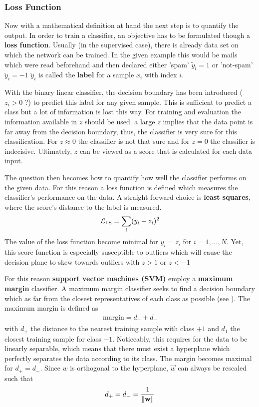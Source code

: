 \subsubsection{Loss Function}
Now with a mathematical definition at hand the next step is to quantify the output.
In order to train a classifier, an objective has to be formulated though a \textbf{loss function}.
Usually (in the supervised case), there is already data set on which the network can be trained.
In the given example this would be mails which were read beforehand and then declared either 'spam' $\tilde{y}_i = 1$ or 'not-spam' $\tilde{y}_i = -1$
$\tilde{y}_i$ is called the \textbf{label} for a sample $x_i$ with index $i$.

With the binary linear classifier, the decision boundary has been introduced ($z_i > 0$ ?) to predict this label for any given sample.
This is sufficient to predict a class but a lot of information is lost this way.
For training and evaluation the information available in $z$ should be used.
\eg a large $z$ implies that the data point is far away from the decision boundary, thus, the classifier is very sure for this classification.
For $z \approx 0$ the classifier is not that sure and for $z = 0$ the classifier is indecisive.
Ultimately, $z$ can be viewed as a score that is calculated for each data input.

The question then becomes how to quantify how well the classifier performs on the given data.
For this reason a loss function is defined which measures the classifier's performance on the data.
A straight forward choice is \textbf{least squares}, where the score's distance to the label is measured.
\begin{align}
    \mathcal{L}_{\text{LS}} = \sum_i (y_i - z_i)^2
\end{align}
The value of the loss function become minimal for $y_i = z_i$ for $i = 1,...,N$.
Yet, this score function is especially susceptible to outliers which will cause the decision plane to skew towards outliers with $z > 1$ or $z < -1$

For this reason \textbf{support vector machines (SVM)} employ a \textbf{maximum margin} classifier.
A maximum margin classifier seeks to find a decision boundary which as far from the closest representatives of each class as possible (see ).
The maximum margin is defined as
\begin{align}
    \text{margin} = d_+ + d_-
\end{align}
with $d_+$ the distance to the nearest training sample with class $+1$ and $d_1$ the closest training sample for class $-1$.
Noticeably, this requires for the data to be linearly separable, which means that there must exist a hyperplane which perfectly separates the data according to its class.
The margin becomes maximal for $d_+ = d_-$.
Since $w$ is orthogonal to the hyperplane, $\vec{w}$ can always be rescaled such that 
\begin{align}
    d_+ = d_- = \frac{1}{\left\lVert\mathbf{w}\right\rVert}
\end{align}

